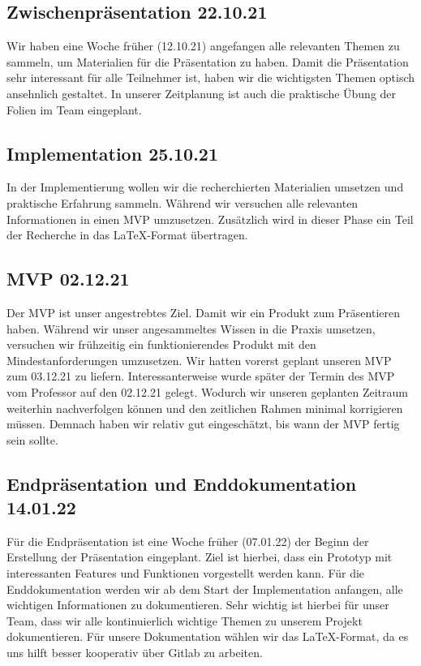 \subsection{Zwischenpräsentation 22.10.21}
Wir haben eine Woche früher (12.10.21) angefangen alle relevanten Themen zu sammeln, um Materialien für die Präsentation zu haben.
Damit die Präsentation sehr interessant für alle Teilnehmer ist, haben wir die wichtigsten Themen optisch ansehnlich gestaltet.
In unserer Zeitplanung ist auch die praktische Übung der Folien im Team eingeplant.

\subsection{Implementation 25.10.21}
In der Implementierung wollen wir die recherchierten Materialien umsetzen und praktische Erfahrung sammeln.
Während wir versuchen alle relevanten Informationen in einen MVP umzusetzen. Zusätzlich wird in dieser Phase
ein Teil der Recherche in das \LaTeX-Format übertragen.

\subsection{MVP 02.12.21}
Der MVP ist unser angestrebtes Ziel. Damit wir ein Produkt zum Präsentieren haben.
Während wir unser angesammeltes Wissen in die Praxis umsetzen, versuchen wir
frühzeitig ein funktionierendes Produkt mit den Mindestanforderungen umzusetzen.
Wir hatten vorerst geplant unseren MVP zum 03.12.21 zu liefern.
Interessanterweise wurde später der Termin des MVP vom Professor auf den 02.12.21 gelegt.
Wodurch wir unseren geplanten Zeitraum weiterhin nachverfolgen können und
den zeitlichen Rahmen minimal korrigieren müssen. 
Demnach haben wir relativ gut eingeschätzt, bis wann der MVP fertig sein sollte.

\subsection{Endpräsentation und Enddokumentation 14.01.22}
Für die Endpräsentation ist eine Woche früher (07.01.22) der Beginn der Erstellung der Präsentation eingeplant.
Ziel ist hierbei, dass ein Prototyp mit interessanten Features und Funktionen vorgestellt werden kann.
Für die Enddokumentation werden wir ab dem Start der Implementation anfangen, alle wichtigen Informationen zu dokumentieren.
Sehr wichtig ist hierbei für unser Team, dass wir alle kontinuierlich wichtige Themen zu unserem Projekt dokumentieren.
Für unsere Dokumentation wählen wir das \LaTeX-Format, da es uns hilft besser kooperativ über Gitlab zu arbeiten.
